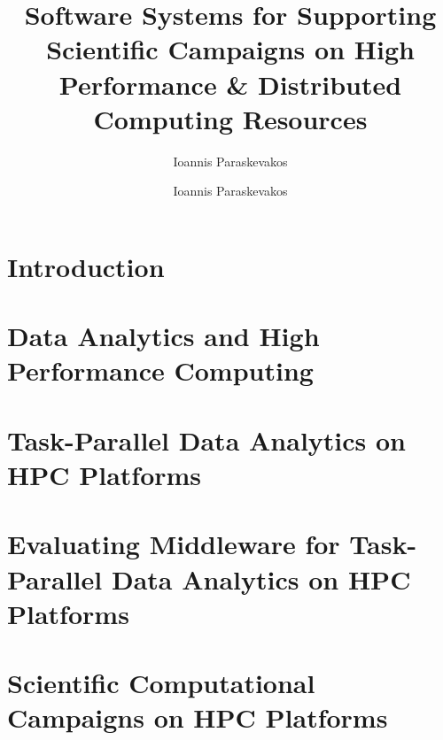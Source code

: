 \documentclass[final]{ruthesis}
\begin{document}
\author{Ioannis Paraskevakos}
\copyrightp
\title{Software Systems for Supporting Scientific Campaigns on High Performance \& Distributed Computing Resources}
\author{Ioannis Paraskevakos}
\figurespage
\tablespage

\abstract{}
\acknowledgements{}

\beforepreface
\afterpreface

\chapter{Introduction}
\label{ch:intro}


\chapter{Data Analytics and High Performance Computing}
\label{ch:pilot-data-hadoop}


\chapter{Task-Parallel Data Analytics on HPC Platforms}
\label{ch:task-par}


\chapter{Evaluating Middleware for Task-Parallel Data Analytics on HPC Platforms}
\label{ch:designs}


\chapter{Scientific Computational Campaigns on HPC Platforms}
\label{ch:cmanager}

\end{document}
